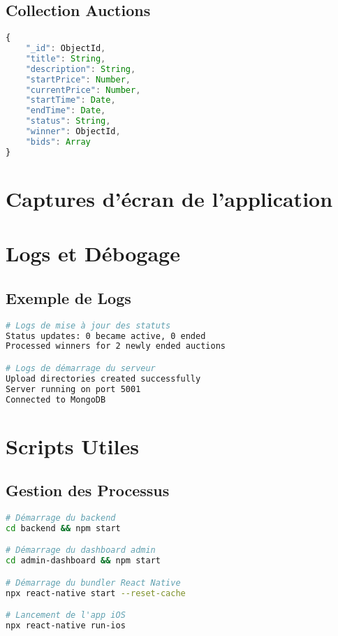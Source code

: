 \subsection{Collection Auctions}
\begin{lstlisting}[language=JavaScript]
{
    "_id": ObjectId,
    "title": String,
    "description": String,
    "startPrice": Number,
    "currentPrice": Number,
    "startTime": Date,
    "endTime": Date,
    "status": String,
    "winner": ObjectId,
    "bids": Array
}
\end{lstlisting}

\section{Captures d'écran de l'application}



\section{Logs et Débogage}
\subsection{Exemple de Logs}
\begin{lstlisting}[language=bash]
# Logs de mise à jour des statuts
Status updates: 0 became active, 0 ended
Processed winners for 2 newly ended auctions

# Logs de démarrage du serveur
Upload directories created successfully
Server running on port 5001
Connected to MongoDB
\end{lstlisting}

\section{Scripts Utiles}
\subsection{Gestion des Processus}
\begin{lstlisting}[language=bash]
# Démarrage du backend
cd backend && npm start

# Démarrage du dashboard admin
cd admin-dashboard && npm start

# Démarrage du bundler React Native
npx react-native start --reset-cache

# Lancement de l'app iOS
npx react-native run-ios
\end{lstlisting} 